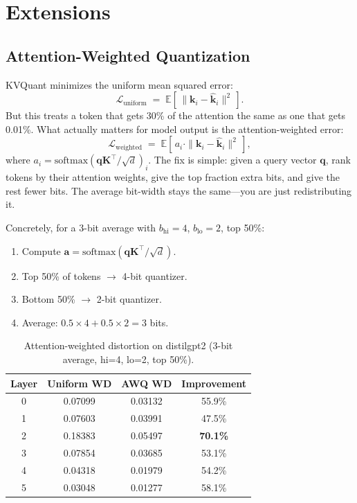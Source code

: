 \documentclass[11pt]{article}
\begin{document}
\section{Extensions}

\subsection{Attention-Weighted Quantization}

KVQuant minimizes the uniform mean squared error:
\begin{equation}
  \mathcal{L}_{\mathrm{uniform}} \;=\; \mathbb{E}\!\left[\,\|\mathbf{k}_i - \hat{\mathbf{k}}_i\|^2\,\right].
\end{equation}
But this treats a token that gets 30\% of the attention the same as one
that gets 0.01\%. What actually matters for model output is the
attention-weighted error:
\begin{equation}
  \mathcal{L}_{\mathrm{weighted}} \;=\; \mathbb{E}\!\left[\,a_i \cdot \|\mathbf{k}_i - \hat{\mathbf{k}}_i\|^2\,\right],
\end{equation}
where $a_i = \mathrm{softmax}(\mathbf{q}\mathbf{K}^\top / \sqrt{d})_i$. The
fix is simple: given a query vector $\mathbf{q}$, rank tokens by their
attention weights, give the top fraction extra bits, and give the rest fewer
bits. The average bit-width stays the same---you are just redistributing it.

Concretely, for a 3-bit average with $b_{\mathrm{hi}}=4$,
$b_{\mathrm{lo}}=2$, top 50\%:
\begin{enumerate}[nosep]
  \item Compute $\mathbf{a} = \mathrm{softmax}(\mathbf{q}\mathbf{K}^\top / \sqrt{d})$.
  \item Top 50\% of tokens $\rightarrow$ 4-bit quantizer.
  \item Bottom 50\% $\rightarrow$ 2-bit quantizer.
  \item Average: $0.5 \times 4 + 0.5 \times 2 = 3$ bits. \checkmark
\end{enumerate}

\begin{table}[h]
\centering
\caption{Attention-weighted distortion on distilgpt2 (3-bit average, hi=4, lo=2, top 50\%).}
\label{tab:awq}
\begin{tabular}{cccc}
\toprule
Layer & Uniform WD & AWQ WD & Improvement \\
\midrule
0 & 0.07099 & 0.03132 & 55.9\% \\
1 & 0.07603 & 0.03991 & 47.5\% \\
2 & 0.18383 & 0.05497 & \textbf{70.1\%} \\
3 & 0.07854 & 0.03685 & 53.1\% \\
4 & 0.04318 & 0.01979 & 54.2\% \\
5 & 0.03048 & 0.01277 & 58.1\% \\
\bottomrule
\end{tabular}
\end{table}
\end{document}
